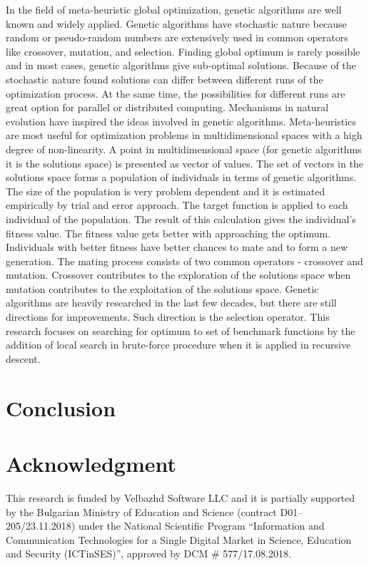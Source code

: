 \documentclass[conference]{IEEEtran}
\begin{document}
In the field of meta-heuristic global optimization, genetic algorithms are well known and widely applied. Genetic algorithms have stochastic nature because random or pseudo-random numbers are extensively used in common operators like crossover, mutation, and selection. Finding global optimum is rarely possible and in most cases, genetic algorithms give sub-optimal solutions. Because of the stochastic nature found solutions can differ between different runs of the optimization process. At the same time, the possibilities for different runs are great option for parallel or distributed computing. Mechanisms in natural evolution have inspired the ideas involved in genetic algorithms. Meta-heuristics are most useful for optimization problems in multidimensional spaces with a high degree of non-linearity. A point in multidimensional space (for genetic algorithms it is the solutions space) is presented as vector of values. The set of vectors in the solutions space forms a population of individuals in terms of genetic algorithms. The size of the population is very problem dependent and it is estimated empirically by trial and error approach. The target function is applied to each individual of the population. The result of this calculation gives the individual's fitness value. The fitness value gets better with approaching the optimum. Individuals with better fitness have better chances to mate and to form a new generation. The mating process consists of two common operators - crossover and mutation. Crossover contributes to the exploration of the solutions space when mutation contributes to the exploitation of the solutions space. Genetic algorithms are heavily researched in the last few decades, but there are still directions for improvements. Such direction is the selection operator. This research focuses on searching for optimum to set of benchmark functions by the addition of local search in brute-force procedure when it is applied in recursive descent. 

\section{Conclusion}

\section*{Acknowledgment}

This research is funded by Velbazhd Software LLC and it is partially supported by the Bulgarian Ministry of Education and Science (contract D01–205/23.11.2018) under the National Scientific Program ``Information and Communication Technologies for a Single Digital Market in Science, Education and Security (ICTinSES)'', approved by DCM \# 577/17.08.2018.

\begin{thebibliography}{99}

\bibitem{}

\end{thebibliography}
\end{document}
